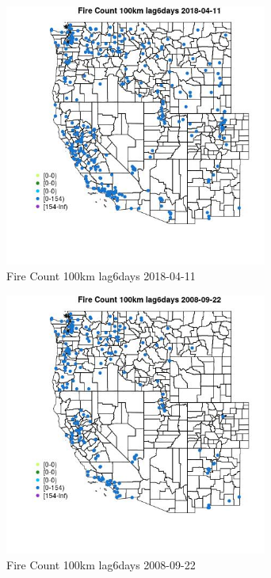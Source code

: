 \begin{figure} 
\centering  
\includegraphics[width=0.77\textwidth]{Code_Outputs/Report_ML_input_PM25_Step4_part_e_de_duplicated_aves_compiled_2019-05-18wNAs_MapObsFire_Count_100km_lag6days2018-04-11.jpg} 
\caption{\label{fig:Report_ML_input_PM25_Step4_part_e_de_duplicated_aves_compiled_2019-05-18wNAsMapObsFire_Count_100km_lag6days2018-04-11}Fire Count 100km lag6days 2018-04-11} 
\end{figure} 
 

\begin{figure} 
\centering  
\includegraphics[width=0.77\textwidth]{Code_Outputs/Report_ML_input_PM25_Step4_part_e_de_duplicated_aves_compiled_2019-05-18wNAs_MapObsFire_Count_100km_lag6days2008-09-22.jpg} 
\caption{\label{fig:Report_ML_input_PM25_Step4_part_e_de_duplicated_aves_compiled_2019-05-18wNAsMapObsFire_Count_100km_lag6days2008-09-22}Fire Count 100km lag6days 2008-09-22} 
\end{figure} 
 

